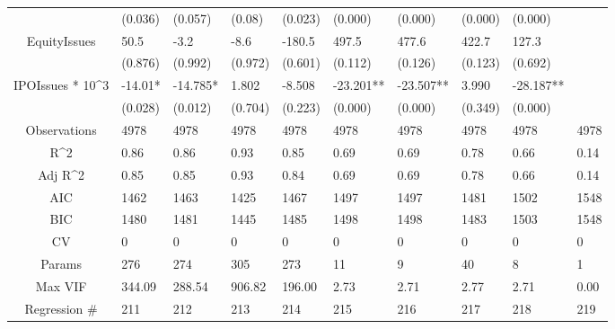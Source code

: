 \documentclass{article}
\begin{document}
\begin{table}[H]
\begin{tabular}{|clllllllll|}
   & (0.036) & (0.057) & (0.08) & (0.023) & (0.000) & (0.000) & (0.000) & (0.000) &  \\ 
  EquityIssues & 50.5 & -3.2 & -8.6 & -180.5 & 497.5 & 477.6 & 422.7 & 127.3 &  \\ 
   & (0.876) & (0.992) & (0.972) & (0.601) & (0.112) & (0.126) & (0.123) & (0.692) &  \\ 
  IPOIssues * 10^3 & -14.01* & -14.785* & 1.802 & -8.508 & -23.201** & -23.507** & 3.990 & -28.187** &  \\ 
   & (0.028) & (0.012) & (0.704) & (0.223) & (0.000) & (0.000) & (0.349) & (0.000) &  \\ 
  \hline 
 Observations & 4978 & 4978 & 4978 & 4978 & 4978 & 4978 & 4978 & 4978 & 4978 \\ 
  R^2 & 0.86 & 0.86 & 0.93 & 0.85 & 0.69 & 0.69 & 0.78 & 0.66 & 0.14 \\ 
  Adj R^2 & 0.85 & 0.85 & 0.93 & 0.84 & 0.69 & 0.69 & 0.78 & 0.66 & 0.14 \\ 
  AIC & 1462 & 1463 & 1425 & 1467 & 1497 & 1497 & 1481 & 1502 & 1548 \\ 
  BIC & 1480 & 1481 & 1445 & 1485 & 1498 & 1498 & 1483 & 1503 & 1548 \\ 
  CV & 0 & 0 & 0 & 0 & 0 & 0 & 0 & 0 & 0 \\ 
  Params & 276 & 274 & 305 & 273 & 11 & 9 & 40 & 8 & 1 \\ 
  Max VIF & 344.09 & 288.54 & 906.82 & 196.00 & 2.73 & 2.71 & 2.77 & 2.71 & 0.00 \\ 
  Regression \# & 211 & 212 & 213 & 214 & 215 & 216 & 217 & 218 & 219 \\ 
   \hline
\end{tabular}
 
\end{table}
\end{document}
